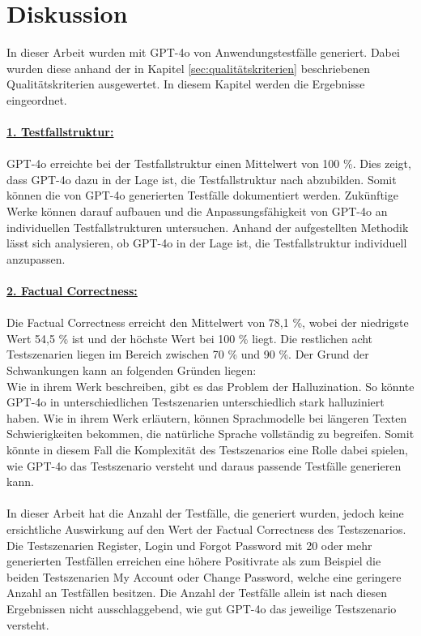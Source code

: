 \documentclass[12pt,toc=bib,toc=listof]{scrreprt}
\begin{document}
\chapter{Diskussion} %
\label{sec:diskussion}
In dieser Arbeit wurden mit GPT-4o von \textcite{OpenAI2025} Anwendungstestfälle generiert. Dabei wurden diese anhand der in Kapitel \ref{sec:qualitätskriterien} beschriebenen Qualitätskriterien ausgewertet. In diesem Kapitel werden die Ergebnisse eingeordnet.\\
\\
\textbf{\underline{1. Testfallstruktur:}}\\
\\
GPT-4o erreichte bei der Testfallstruktur einen Mittelwert von 100 \%. Dies zeigt, dass GPT-4o dazu in der Lage ist, die Testfallstruktur nach \textcite{IsoIecIeee2024} abzubilden. Somit können die von GPT-4o generierten Testfälle dokumentiert werden. Zukünftige Werke können darauf aufbauen und die Anpassungsfähigkeit von GPT-4o an individuellen Testfallstrukturen untersuchen. Anhand der aufgestellten Methodik lässt sich analysieren, ob GPT-4o in der Lage ist, die Testfallstruktur individuell anzupassen.\\
\\
\textbf{\underline{2. Factual Correctness:}}\\
\\
Die Factual Correctness erreicht den Mittelwert von 78,1 \%, wobei der niedrigste Wert 54,5 \% ist und der höchste Wert bei 100 \% liegt. Die restlichen acht Testszenarien liegen im Bereich zwischen 70 \% und 90 \%. Der Grund der Schwankungen kann an folgenden Gründen liegen:\\
\noindent Wie \textcite{Li2024} in ihrem Werk beschreiben, gibt es das Problem der Halluzination. So könnte GPT-4o in unterschiedlichen Testszenarien unterschiedlich stark halluziniert haben. Wie \textcite{Iqbal2022} in ihrem Werk erläutern, können Sprachmodelle bei längeren Texten Schwierigkeiten bekommen, die natürliche Sprache vollständig zu begreifen. Somit könnte in diesem Fall die Komplexität des Testszenarios eine Rolle dabei spielen, wie GPT-4o das Testszenario versteht und daraus passende Testfälle generieren kann.\\
\\
In dieser Arbeit hat die Anzahl der Testfälle, die generiert wurden, jedoch keine ersichtliche Auswirkung auf den Wert der Factual Correctness des Testszenarios. Die Testszenarien \glqq Register\grqq{}, \glqq Login\grqq{} und \glqq Forgot Password\grqq{} mit 20 oder mehr generierten Testfällen erreichen eine höhere Positivrate als zum Beispiel die beiden Testszenarien \glqq My Account\grqq{} oder \glqq Change Password\grqq{}, welche eine geringere Anzahl an Testfällen besitzen. Die Anzahl der Testfälle allein ist nach diesen Ergebnissen nicht ausschlaggebend, wie gut GPT-4o das jeweilige Testszenario versteht.\\
\end{document}
